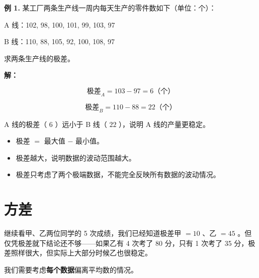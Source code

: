 \begin{workedexamples}


\textbf{例 1.} 某工厂两条生产线一周内每天生产的零件数如下（单位：个）：

A 线：102, 98, 100, 101, 99, 103, 97

B 线：110, 88, 105, 92, 100, 108, 97

求两条生产线的极差。

\textbf{解：}

\[
\text{极差}_A = 103 - 97 = 6 \text{（个）}
\]


\[
\text{极差}_B = 110 - 88 = 22 \text{（个）}
\]


A 线的极差（ $6$ ）远小于 B 线（ $22$ ），说明 A 线的产量更稳定。

\end{workedexamples}

\begin{keytakeaway}


\begin{itemize}
  \item 极差 $=$ 最大值 $-$ 最小值。
  \item 极差越大，说明数据的波动范围越大。
  \item 极差只考虑了两个极端数据，不能完全反映所有数据的波动情况。
\end{itemize}


\end{keytakeaway}



\section*{方差}


\begin{explore}


继续看甲、乙两位同学的 5 次成绩，我们已经知道极差甲 $= 10$ 、乙 $= 45$ 。但仅凭极差就下结论还不够——如果乙有 4 次考了 80 分，只有 1 次考了 35 分，极差照样很大，但实际上大部分时候乙也很稳定。

我们需要考虑\textbf{每个数据}偏离平均数的情况。

\end{explore}

